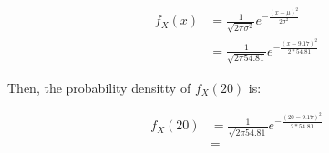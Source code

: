 \documentclass{article}
\begin{document}
\begin{align*}
f_X(x) &= \frac{1}{\sqrt{2\pi\sigma^2}}e^{-\frac{(x-\mu)^2}{2\sigma^2}}\\
&= \frac{1}{\sqrt{2\pi54.81}}e^{-\frac{(x-9.17)^2}{2*54.81}}
\end{align*}

Then, the probability densitty of $f_X(20)$ is:

\begin{align*}
f_X(20) &=\frac{1}{\sqrt{2\pi54.81}}e^{-\frac{(20-9.17)^2}{2*54.81}}\\
&= 
\end{align*}
\end{document}
